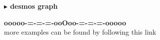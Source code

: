 \documentclass{ximera}
\begin{document}
\begin{onlineOnly}
\textbf{\textcolor{blue!55!black}{$\blacktriangleright$ desmos graph}} 
\begin{center}
\end{center}
\end{onlineOnly}




\begin{onlineOnly}
\begin{center}
\textbf{\textcolor{green!50!black}{ooooo-=-=-=-ooOoo-=-=-=-ooooo}} \\

more examples can be found by following this link\\ 

\end{center}
\end{onlineOnly}
\end{document}
